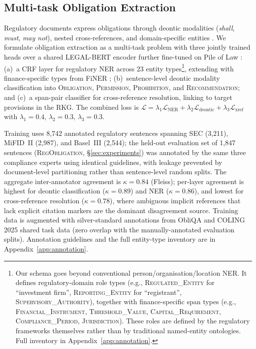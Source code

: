 \documentclass[11pt]{article}
\begin{document}
\subsection{Multi-task Obligation Extraction}
\label{sec:extraction}

Regulatory documents express obligations through deontic modalities (\emph{shall}, \emph{must}, \emph{may not}), nested cross-references, and domain-specific entities \citep{minkova2023deontic}. We formulate obligation extraction as a multi-task problem with three jointly trained heads over a shared LEGAL-BERT encoder \citep{chalkidis2020legalbert} further fine-tuned on Pile of Law \citep{henderson2022pileoflaw}: (a)~a CRF layer for regulatory NER across 23 entity types\footnote{Our schema goes beyond conventional person/organisation/location NER. It defines regulatory-domain role types (e.g., \textsc{Regulated\_Entity} for ``investment firm'', \textsc{Reporting\_Entity} for ``registrant'', \textsc{Supervisory\_Authority}), together with finance-specific span types (e.g., \textsc{Financial\_Instrument}, \textsc{Threshold\_Value}, \textsc{Capital\_Requirement}, \textsc{Compliance\_Period}, \textsc{Jurisdiction}). These roles are defined by the regulatory frameworks themselves rather than by traditional named-entity ontologies. Full inventory in Appendix~\ref{app:annotation}.}, extending \citet{leitner2020germanner} with finance-specific types from FiNER \citep{loukas2022finer}; (b)~sentence-level deontic modality classification into \textsc{Obligation}, \textsc{Permission}, \textsc{Prohibition}, and \textsc{Recommendation}; and (c)~a span-pair classifier for cross-reference resolution, linking to target provisions in the RKG. The combined loss is $\mathcal{L} = \lambda_1 \mathcal{L}_{\text{NER}} + \lambda_2 \mathcal{L}_{\text{deontic}} + \lambda_3 \mathcal{L}_{\text{xref}}$ with $\lambda_1{=}0.4$, $\lambda_2{=}0.3$, $\lambda_3{=}0.3$.

Training uses 8{,}742 annotated regulatory sentences spanning SEC (3{,}211), MiFID~II (2{,}987), and Basel~III (2{,}544); the held-out evaluation set of 1{,}847 sentences (\textsc{RegObligation}, \S\ref{sec:experiments}) was annotated by the same three compliance experts using identical guidelines, with leakage prevented by document-level partitioning rather than sentence-level random splits. The aggregate inter-annotator agreement is $\kappa{=}0.84$ (Fleiss); per-layer agreement is highest for deontic classification ($\kappa{=}0.89$) and NER ($\kappa{=}0.86$), and lowest for cross-reference resolution ($\kappa{=}0.78$), where ambiguous implicit references that lack explicit citation markers are the dominant disagreement source. Training data is augmented with silver-standard annotations from ObliQA \citep{gokhan2025regnlp} and COLING 2025 shared task data \citep{wang2025colingregs} (zero overlap with the manually-annotated evaluation splits). Annotation guidelines and the full entity-type inventory are in Appendix~\ref{app:annotation}.
\end{document}
